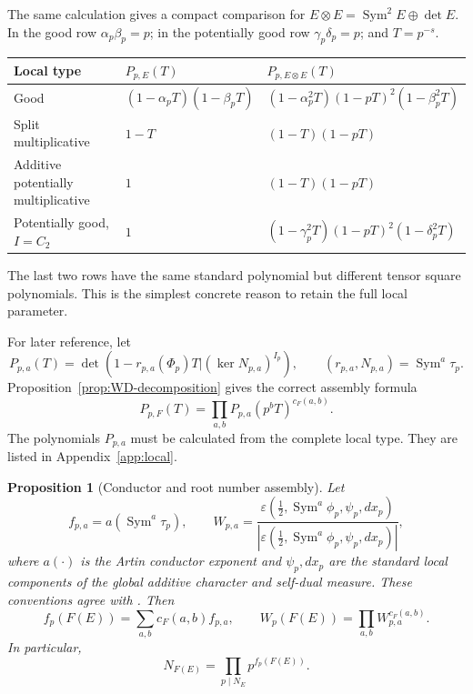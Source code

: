 \documentclass[11pt,reqno]{amsart}
\newtheorem{proposition}[theorem]{Proposition}
\theoremstyle{definition}
\theoremstyle{remark}
\newcommand{\Sym}{\operatorname{Sym}}
\newcommand{\eps}{\varepsilon}
\begin{document}
The same calculation gives a compact comparison for
$E\otimes E=\Sym^2E\oplus\det E$.  In the good row
$\alpha_p\beta_p=p$; in the potentially good row
$\gamma_p\delta_p=p$; and $T=p^{-s}$.
\begin{center}
\renewcommand{\arraystretch}{1.15}
\begin{tabular}{@{}lll@{}}
\toprule
Local type & $P_{p,E}(T)$ & $P_{p,E\otimes E}(T)$ \\
\midrule
Good & $(1-\alpha_pT)(1-\beta_pT)$
& $(1-\alpha_p^2T)(1-pT)^2(1-\beta_p^2T)$ \\
Split multiplicative & $1-T$ & $(1-T)(1-pT)$ \\
Additive potentially multiplicative & $1$ & $(1-T)(1-pT)$ \\
Potentially good, $I=C_2$ & $1$
& $(1-\gamma_p^2T)(1-pT)^2(1-\delta_p^2T)$ \\
\bottomrule
\end{tabular}
\end{center}
The last two rows have the same standard polynomial but different tensor
square polynomials.  This is the simplest concrete reason to retain the full
local parameter.

For later reference, let
\begin{equation}\label{eq:Ppa}
 P_{p,a}(T)=
 \det\left(
 1-r_{p,a}(\Phi_p)T
 \mathrel{\big|}(\ker N_{p,a})^{I_p}
 \right),
 \qquad
 (r_{p,a},N_{p,a})=\Sym^a\tau_p.
\end{equation}
Proposition~\ref{prop:WD-decomposition} gives the correct assembly formula
\begin{equation}\label{eq:P-F-assembly}
 P_{p,F}(T)=
 \prod_{a,b}P_{p,a}(p^bT)^{c_F(a,b)}.
\end{equation}
The polynomials $P_{p,a}$ must be calculated from the complete local type.
They are listed in Appendix~\ref{app:local}.

\begin{proposition}[Conductor and root number assembly]\label{prop:conductor-assembly}
Let
\begin{equation*}
 f_{p,a}=a(\Sym^a\tau_p),\qquad
 W_{p,a}=
 \frac{\eps(\tfrac12,\Sym^a\phi_p,\psi_p,dx_p)}
 {|\eps(\tfrac12,\Sym^a\phi_p,\psi_p,dx_p)|},
\end{equation*}
where $a(\cdot)$ is the Artin conductor exponent and $\psi_p,dx_p$ are the
standard local components of the global additive character and self-dual
measure.  These conventions agree with \cite{Deligne,DMW}.  Then
\begin{equation}\label{eq:conductor-root-assembly}
 f_p(F(E))=\sum_{a,b}c_F(a,b)f_{p,a},
 \qquad
 W_p(F(E))=\prod_{a,b}W_{p,a}^{c_F(a,b)}.
\end{equation}
In particular,
\begin{equation}\label{eq:global-conductor}
 N_{F(E)}=\prod_{p\mid N_E}p^{f_p(F(E))}.
\end{equation}
\end{proposition}
\end{document}
